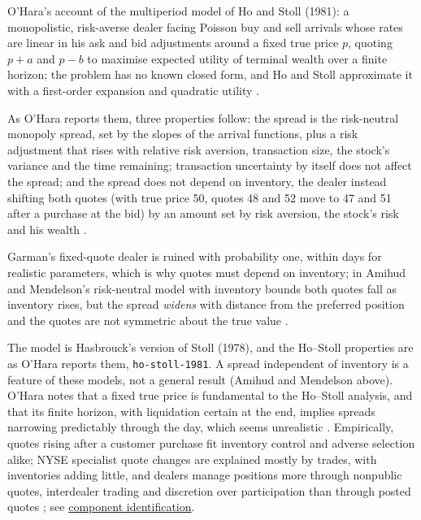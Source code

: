 \begin{qfmodel}
 O'Hara's account of the multiperiod model of Ho and Stoll (1981): a monopolistic, risk-averse dealer facing Poisson buy and sell arrivals whose rates are linear in his ask and bid adjustments around a fixed true price $p$, quoting $p+a$ and $p-b$ to maximise expected utility of terminal wealth over a finite horizon; the problem has no known closed form, and Ho and Stoll approximate it with a first-order expansion and quadratic utility \citep[sec.~2.3, pp.~29--35]{catalogue-0496}.

As O'Hara reports them, three properties follow: the spread is the risk-neutral monopoly spread, set by the slopes of the arrival functions, plus a risk adjustment that rises with relative risk aversion, transaction size, the stock's variance and the time remaining; transaction uncertainty by itself does not affect the spread; and the spread does not depend on inventory, the dealer instead shifting both quotes (with true price 50, quotes 48 and 52 move to 47 and 51 after a purchase at the bid) by an amount set by risk aversion, the stock's risk and his wealth \citep[same sec., pp.~35--36]{catalogue-0496}.

Garman's fixed-quote dealer is ruined with probability one, within days for realistic parameters, which is why quotes must depend on inventory; in Amihud and Mendelson's risk-neutral model with inventory bounds both quotes fall as inventory rises, but the spread \emph{widens} with distance from the preferred position and the quotes are not symmetric about the true value \citep[secs.~11.1.1--11.1.2, pp.~107--109]{s6-hasbrouck}.

 The model is Hasbrouck's version of Stoll (1978), and the Ho--Stoll properties are as O'Hara reports them, \nolinkurl{ho-stoll-1981}. A spread independent of inventory is a feature of these models, not a general result (Amihud and Mendelson above). O'Hara notes that a fixed true price is fundamental to the Ho--Stoll analysis, and that its finite horizon, with liquidation certain at the end, implies spreads narrowing predictably through the day, which seems unrealistic \citep[sec.~2.3, p.~36]{catalogue-0496}. Empirically, quotes rising after a customer purchase fit inventory control and adverse selection alike; NYSE specialist quote changes are explained mostly by trades, with inventories adding little, and dealers manage positions more through nonpublic quotes, interdealer trading and discretion over participation than through posted quotes \citep[secs.~11.4--11.5, pp.~115--117]{s6-hasbrouck}; see \hyperref[res:spread-component-identification]{component identification}.


\end{qfmodel}
